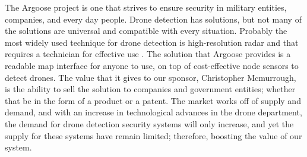 The Argoose project is one that strives to ensure security in military entities, companies, and every day people.  Drone detection has solutions, but not many of the solutions are universal and compatible with every situation.  Probably the most widely used technique for drone detection is high-resolution radar and that requires a technician for effective use \cite{coluccia2020detection}.  The solution that Argoose provides is a readable map interface for anyone to use, on top of cost-effective node sensors to detect drones.  The value that it gives to our sponsor, Christopher Mcmurrough, is the ability to sell the solution to companies and government entities; whether that be in the form of a product or a patent.  The market works off of supply and demand, and with an increase in technological advances in the drone department, the demand for drone detection security systems will only increase, and yet the supply for these systems have remain limited; therefore, boosting the value of our system.